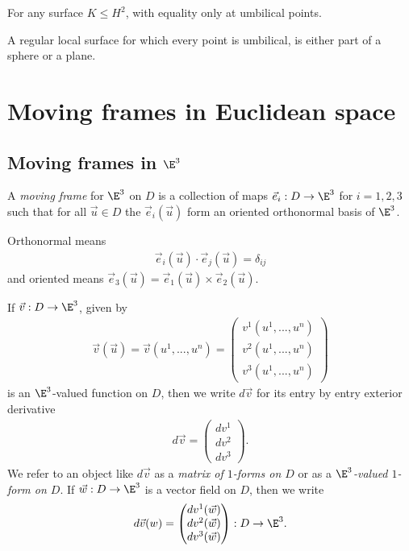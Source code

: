 \documentclass{article}
\begin{document}
\begin{lemma}[Notes 9.22]
    For any surface $K\leq H^2$, with equality only at umbilical points.
\end{lemma}

\begin{theorem}[Notes 9.23]
    A regular local surface for which every point is umbilical, is either part of a sphere 
    or a plane.
\end{theorem}

\section{Moving frames in Euclidean space}

\subsection{Moving frames in $\E^3$}

\begin{definition}
    A \emph{moving frame} for $\E^3$ on $D$ is a collection of maps $\vec e_i:D\to\E^3$
    for $i=1,2,3$ such that for all $\vec u\in D$ the $\vec e_i(\vec u)$ form an oriented orthonormal
    basis of $\E^3$.

    Orthonormal means 
    \begin{align*}
        \vec e_i(\vec u) \cdot \vec e_j(\vec u) = \delta_{ij}
    \end{align*}
    and oriented means $\vec e_3(\vec u) = \vec e_1(\vec u) \times \vec e_2(\vec u)$.
\end{definition}

\begin{definition}
    If $\vec v:D\to\E^3$, given by 
    \begin{align*}
        \vec v(\vec u)=\vec v(u^1,...,u^n)=\begin{pmatrix}
            v^1(u^1,...,u^n)\\ 
            v^2(u^1,...,u^n)\\
            v^3(u^1,...,u^n)
        \end{pmatrix}
    \end{align*}
    is an $\E^3$-valued function on $D$, then we write $d\vec v$ for its entry
    by entry exterior derivative 
    \begin{align*}
        d\vec v = \begin{pmatrix}
            dv^1 \\ dv^2 \\ dv^3
        \end{pmatrix}.
    \end{align*}
    We refer to an object like $d\vec v$ as a \emph{matrix of $1$-forms on $D$} or as a 
    \emph{$\E^3$-valued $1$-form on $D$}. If $\vec w:D\to\E^3$ is a vector field on $D$, then we write
    \begin{align*}
        d\vec v(w) = \begin{pmatrix}
            dv^1(\vec w) \\ dv^2(\vec w) \\ dv^3(\vec w)
        \end{pmatrix} : D\to\E^3.
    \end{align*}
\end{definition}
\end{document}
